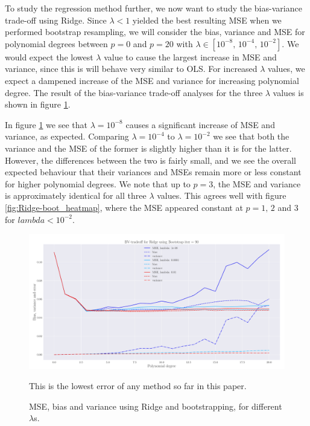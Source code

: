 \documentclass[reprint,english,notitlepage,aps,nobalancelastpage,nofootinbib]{revtex4-1}  %
\begin{document}
To study the regression method further, we now want to study the bias-variance trade-off using Ridge. Since $\lambda<1$ yielded the best resulting MSE when we performed bootstrap resampling, we will consider the bias, variance and MSE for polynomial degrees between $p=0$ and $p=20$ with $\lambda\in[10^{-8},\,10^{-4},\,10^{-2}]$. We would expect the lowest $\lambda$ value to cause the largest increase in MSE and variance, since this is will behave very similar to OLS. For increased $\lambda$ values, we expect a dampened increase of the MSE and variance for increasing polynomial degree. The result of the bias-variance trade-off analyses for the three $\lambda$ values is shown in figure \ref{fig:Ridge_boot_BVT}.

In figure \ref{fig:Ridge_boot_BVT} we see that $\lambda=10^{-8}$ causes a significant increase of MSE and variance, as expected. Comparing $\lambda=10^{-4}$ to $\lambda=10^{-2}$ we see that both the variance and the MSE of the former is slightly higher than it is for the latter. However, the differences between the two is fairly small, and we see the overall expected behaviour that their variances and MSEs remain more or less constant for higher polynomial degrees. We note that up to $p=3$, the MSE and variance is approximately identical for all three $\lambda$ values. This agrees well with figure \ref{fig:Ridge-boot_heatmap}, where the MSE appeared constant at $p=1,\,2$ and $3$ for $lambda<10^{-2}$.

\begin{figure}[h]
	\includegraphics[width=\linewidth]{LBVT_Ridge_Bootstrap_n30_eps0_2_p20_lmbm8_m2.pdf}
	\caption{MSE, bias and variance using Ridge and bootstrapping, for different $\lambda$s.}
	\label{fig:Ridge_boot_BVT}This is the lowest error of any method so far in this paper.
\end{figure}
\end{document}

